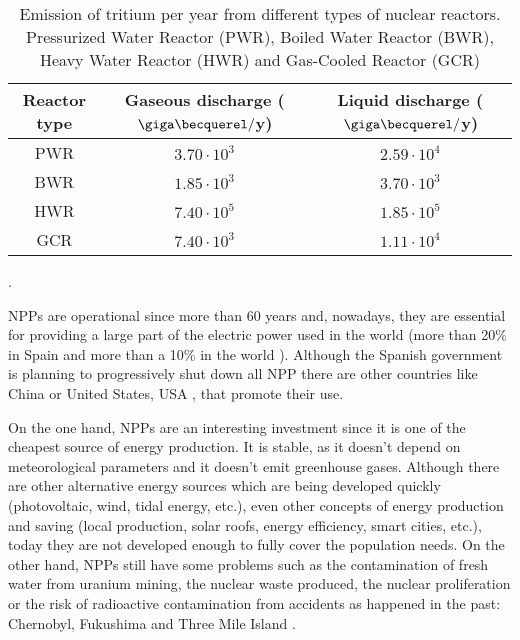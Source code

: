 \begin{table}[htbp]
\begin{center}
\begin{tabular}{|c|c|c|}
\hline
Reactor type & Gaseous discharge ($\giga\becquerel/$y) & Liquid discharge ($\giga\becquerel/$y) \\
\hline \hline \hline
PWR & $3.70\cdot 10^{3}$ & $2.59\cdot 10^{4}$ \\ \hline
BWR & $1.85\cdot 10^{3}$ & $3.70\cdot 10^{3}$ \\ \hline
HWR & $7.40\cdot 10^{5}$ & $1.85\cdot 10^{5}$ \\ \hline
GCR & $7.40\cdot 10^{3}$ & $1.11\cdot 10^{4}$ \\ \hline
\end{tabular}
\caption{Emission of tritium per year from different types of nuclear reactors. Pressurized Water Reactor (PWR), Boiled Water Reactor (BWR), Heavy Water Reactor (HWR) and Gas-Cooled Reactor (GCR) \cite{CommonEmissionTritium}}.
\label{tab:TritiumEmisionsNPPs}
\end{center}
\end{table} 

NPPs are operational since more than 60 years and, nowadays, they are essential for providing a large part of the electric power used in the world (more than 20\% in Spain \cite{PercentageEnergySpain} and more than a 10\% in the world \cite{PercentageEnergyWorld}). Although the Spanish government is planning to progressively shut down all NPP there are other countries like China \cite{60ReactorsChina} or United States, USA \cite{35MillionsUSA}, that promote their use.

On the one hand, NPPs are an interesting investment since it is one of the cheapest source of energy production. It is stable, as it doesn't depend on  meteorological parameters and it doesn't emit greenhouse gases. Although there are other alternative energy sources which are being developed quickly  (photovoltaic, wind, tidal energy, etc.), even other concepts of energy production and saving (local production, solar roofs, energy efficiency, smart cities, etc.), today they are not developed enough to fully cover the population needs. On the other hand, NPPs still have some problems such as the contamination of fresh water from uranium mining, the nuclear waste produced, the nuclear proliferation or the risk of radioactive contamination from accidents as happened in the past: Chernobyl, Fukushima and Three Mile Island \cite{ThreeMileIsland}.

